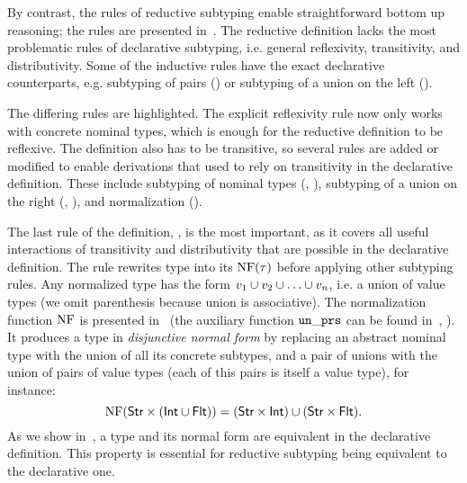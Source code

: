 By contrast, the rules of reductive subtyping enable
straightforward bottom up reasoning;
the rules are presented in~.
The reductive definition lacks the most problematic rules
of declarative subtyping, 
i.e. general reflexivity, transitivity, and distributivity.
Some of the inductive rules have the exact declarative counterparts,
e.g. subtyping of pairs () or
subtyping of a union on the left ().

The differing rules are \colorbox{light-gray}{highlighted}.
The explicit reflexivity rule  now only works with 
concrete nominal types, which is enough 
for the reductive definition to be reflexive.
The definition also has to be transitive,
so several rules are added or modified to enable derivations
that used to rely on transitivity in the declarative definition.
These include subtyping of nominal types (, ),
subtyping of a union on the right (, ),
and normalization ().

The last rule of the definition, , is the most important,
as it covers all useful interactions of transitivity and distributivity 
that are possible in the declarative definition.
The rule rewrites type \ty into its  $\mathop{\mathrm{NF}}(\tau)$
before applying other subtyping rules.
Any normalized type has the form $v_1 \cup v_2 \cup \ldots \cup v_n$,
i.e. a union of value types
(we omit parenthesis because union is associative).
The normalization function $\mathop{\mathrm{NF}}$ is presented in~
(the auxiliary function $\mathop{\mathtt{un\_prs}}$ 
can be found in~, ).
It produces a type in \emph{disjunctive normal form}
by replacing an abstract nominal type 
with the union of all its concrete subtypes, 
and a pair of unions with the union of pairs of value types
(each of this pairs is itself a value type),
for instance:
\[
\mathop{\mathrm{NF}}(\mathsf{Str} \times (\mathsf{Int} \cup \mathsf{Flt})) =
(\mathsf{Str} \times \mathsf{Int}) \cup (\mathsf{Str} \times \mathsf{Flt}).
\]
As we show in~, a type and its normal form are
equivalent in the declarative definition.
This property is essential for reductive subtyping 
being equivalent to the declarative one.


